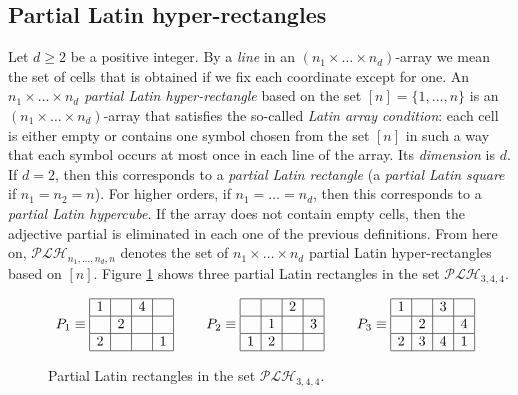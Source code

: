 \documentclass{article}
\begin{document}
\vspace{0.5cm}

\subsection{Partial Latin hyper-rectangles}

Let $d\geq 2$  be a positive integer. By a \emph{line} in an $(n_1\times\ldots\times n_d)$-array we mean the set of cells that is obtained if we fix each coordinate except for one.
An {\em $n_1\times\ldots\times n_d$ partial Latin hyper-rectangle} based on the set $[n]=\{1,\ldots,n\}$ is an $(n_1\times\ldots\times n_d)$-array that satisfies the so-called {\em 
Latin 
array condition}:  each cell is either empty or contains one symbol chosen from the set $[n]$ in such a way that each symbol occurs at most once in each line of the array. 
Its {\em dimension} is $d$. If $d=2$, then this 
corresponds to a {\em partial Latin rectangle} (a {\em partial Latin square} if $n_1=n_2=n$). For higher orders, if $n_1=\ldots=n_d$, then this corresponds to a {\em partial Latin hypercube}. If the array does not contain empty cells, then the adjective partial is eliminated in each one of the previous definitions. From here on, $\mathcal{PLH}_{n_1,\ldots,n_d,n}$ denotes the set of $n_1\times\ldots\times n_d$ partial Latin hyper-rectangles based on $[n]$. Figure \ref{Fig1} shows three partial Latin rectangles in the set $\mathcal{PLH}_{3,4,4}$.

\begin{figure}[htbp]
\begin{center}
$\begin{array}{ccccc}P_1\equiv\begin{array}{|c|c|c|c|} \hline
1 & \ & 4 & \ \\ \hline
\ & 2 & \ & \ \\ \hline
2 & \ & \ & 1 \\ \hline
\end{array} & \ & P_2\equiv\begin{array}{|c|c|c|c|} \hline
\ & \ & 2 & \ \\ \hline
\ & 1 & \ & 3 \\ \hline
1 & 2 & \ & \ \\ \hline
\end{array} & \ & P_3\equiv\begin{array}{|c|c|c|c|} \hline
1 & \ & 3 & \ \\ \hline
\ & 2 & \ & 4\\ \hline
2 & 3 & 4 & 1 \\ \hline
\end{array}\end{array}$
\caption{Partial Latin rectangles in the set $\mathcal{PLH}_{3,4,4}$.}
\label{Fig1}
\end{center}
\end{figure}
\end{document}
